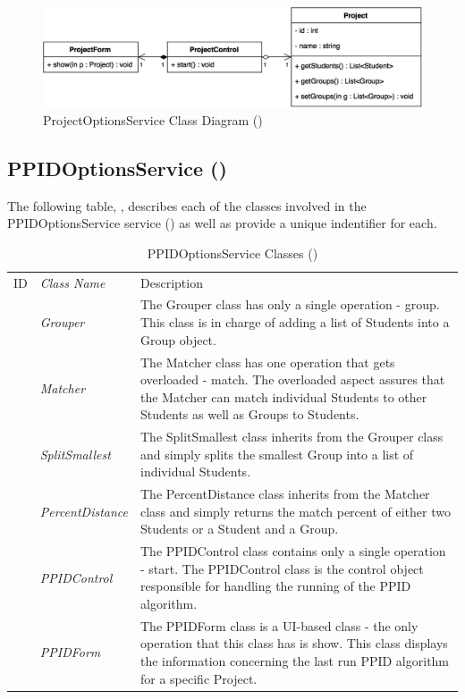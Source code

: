 \documentclass[12pt,letterpaper]{article}
\begin{document}
\begin{figure}[H]
	\centering{}
	\includegraphics[scale=0.35]{imgs/d3/interfaces/project-options.png}
	\caption{ProjectOptionsService Class Diagram ()}
\end{figure}

\subsection{PPIDOptionsService ()}

The following table, , describes each of the classes involved in the PPIDOptionsService service () as well as provide a unique indentifier for each.

\begin{table}[H]
	\caption{PPIDOptionsService Classes ()} 
	\begin{tabu} to 
	    \tableheader{}ID & Class Name & Description \\
		 & Grouper & The Grouper class has only a single operation - group. This class is in charge of adding a list of Students into a Group object.\\
		 & Matcher & The Matcher class has one operation that gets overloaded - match. The overloaded aspect assures that the Matcher can match individual Students to other Students as well as Groups to Students.\\
		 & SplitSmallest & The SplitSmallest class inherits from the Grouper class and simply splits the smallest Group into a list of individual Students.\\
		 & PercentDistance & The PercentDistance class inherits from the Matcher class and simply returns the match percent of either two Students or a Student and a Group.\\
		 & PPIDControl & The PPIDControl class contains only a single operation - start. The PPIDControl class is the control object responsible for handling the running of the PPID algorithm.\\
		 & PPIDForm & The PPIDForm class is a UI-based class - the only operation that this class has is show. This class displays the information concerning the last run PPID algorithm for a specific Project.\\
	\end{tabu}
\end{table}
\end{document}
